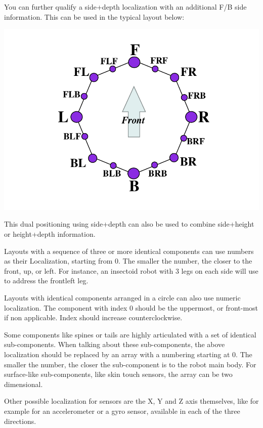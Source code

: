 You can further qualify a side+depth localization with an additional
F/B side information. This can be used in the typical layout below:

\begin{center}
  \includegraphics{img/localizer-multidim}
\end{center}

This dual positioning using side+depth can also be used to combine
side+height or height+depth information.

Layouts with a sequence of three or more identical components can use numbers
as their Localization, starting from 0.  The smaller the number, the closer to
the front, up, or left. For instance, an insectoid robot with 3 legs on each
side will use
 to address the frontleft leg.

Layouts with identical components arranged in a circle can also use numeric
localization. The component with index 0 should be the uppermost, or front-most
if non applicable. Index should increase counterclockwise.

Some components like spines or tails are highly articulated with a set
of identical sub-components. When talking about these sub-components,
the above localization should be replaced by an array with a numbering
starting at 0. The smaller the number, the closer the sub-component is
to the robot main body. For surface-like sub-components, like skin
touch sensors, the array can be two dimensional.


Other possible localization for sensors are the X, Y and Z axis
themselves, like for example for an accelerometer or a gyro sensor,
available in each of the three directions.

